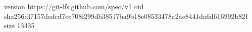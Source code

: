 version https://git-lfs.github.com/spec/v1
oid sha256:d7157dedcd7cc708f299db38517ba9b18e08533478a2ae8441da6d616992b82f
size 13435
